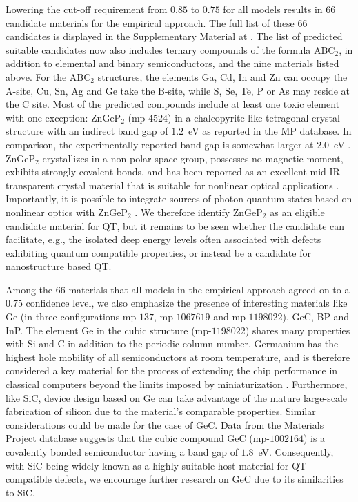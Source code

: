 \documentclass[superscriptaddress,unsortedaddress,
 amsmath,amssymb,
 aps,
]{revtex4-2}
\begin{document}
Lowering the cut-off requirement from $0.85$ to $0.75$ for all models results in $66$ candidate materials for the empirical approach.  
The full list of these $66$ candidates is displayed in the Supplementary Material at \cite{supplementary}. 
The list of predicted suitable candidates now also includes ternary compounds of the formula ABC$_2$, in addition to elemental and binary semiconductors, and the nine materials listed above. For the ABC$_2$ structures, the elements Ga, Cd, In and Zn can occupy the A-site, Cu, Sn, Ag and Ge take the B-site, while S, Se, Te, P or As may reside at the C site. Most of the predicted compounds include at least one toxic element with one exception: ZnGeP$_2$ (mp-$4524$) in a chalcopyrite-like tetragonal crystal structure with an indirect band gap of $1.2$~eV \cite{Zhang2015} as reported in the MP database. In comparison, the experimentally reported band gap is somewhat larger at $2.0$~eV \cite{Xing1989}. 
ZnGeP$_2$ crystallizes in a non-polar space group, possesses no magnetic moment, exhibits strongly covalent bonds, and has been reported as an excellent mid-IR transparent crystal material that is suitable for nonlinear optical applications \cite{Zhang2015}. Importantly, it is possible to integrate sources of photon quantum states based on nonlinear optics with ZnGeP$_2$ \cite{Caspani2017}. 
We therefore identify ZnGeP$_2$ as an eligible candidate material for QT, but it remains to be seen whether the candidate can facilitate, e.g., the isolated deep energy levels often associated with defects exhibiting quantum compatible properties, or instead be a candidate for nanostructure based QT.  

Among the $66$ materials that all models in the empirical approach agreed on to a $0.75$ confidence level, we also emphasize the presence of interesting materials like Ge (in three configurations mp-$137$, mp-$1067619$ and mp-$1198022$), GeC, BP and InP. The element Ge in the cubic structure (mp-$1198022$) shares many properties with Si and C in addition to the periodic column number. 
Germanium has the highest hole mobility of all semiconductors at room temperature, and is therefore considered a key material for the process of extending the chip performance in classical computers beyond the limits imposed by miniaturization \cite{Scappucci2020}. Furthermore, like SiC, device design based on Ge can take advantage of the mature large-scale fabrication of silicon due to the material's comparable properties.  
%
Similar considerations could be made for the case of GeC. 
Data from the Materials Project database suggests that the cubic compound GeC (mp-$1002164$) is a covalently bonded semiconductor having a band gap of $1.8$~eV. 
Consequently, with SiC being widely known as a highly suitable host material for QT compatible defects, we encourage further research on GeC due to its similarities to SiC. 
\end{document}
